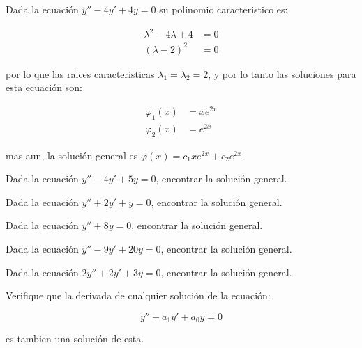 		\begin{ejemplo}
			Dada la ecuación $y'' - 4 y' + 4 y = 0$ su polinomio caracteristico es:

			\begin{align*}
				\lambda^2 - 4 \lambda + 4 &= 0 \\
				(\lambda - 2)^2 &= 0
			\end{align*}

			por lo que las raices caracteristicas $\lambda_1 = \lambda_2 = 2$, y por lo tanto las soluciones para esta ecuación son:

			\begin{align*}
				\varphi_1(x) &= x e^{2x} \\
				\varphi_2(x) &= e^{2x}
			\end{align*}

			mas aun, la solución general es $\varphi(x) = c_1 x e^{2x} + c_2 e^{2x}$.
		\end{ejemplo}

		\begin{ejercicio}
			Dada la ecuación $y'' - 4 y' + 5 y = 0$, encontrar la solución general.
		\end{ejercicio}

		\begin{ejercicio}
			Dada la ecuación $y'' + 2 y' + y = 0$, encontrar la solución general.
		\end{ejercicio}

		\begin{ejercicio}
			Dada la ecuación $y'' + 8 y = 0$, encontrar la solución general.
		\end{ejercicio}

		\begin{ejercicio}
			Dada la ecuación $y'' - 9 y' + 20 y = 0$, encontrar la solución general.
		\end{ejercicio}

		\begin{ejercicio}
			Dada la ecuación $2 y'' + 2 y' + 3 y = 0$, encontrar la solución general.
		\end{ejercicio}

		\begin{ejercicio}
			Verifique que la derivada de cualquier solución de la ecuación:

			\begin{equation*}
				y'' + a_1 y' + a_0 y = 0
			\end{equation*}

			es tambien una solución de esta.
		\end{ejercicio}

